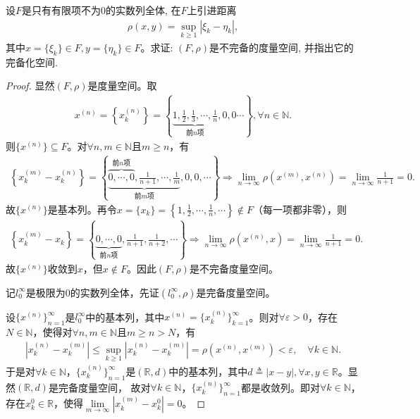 \documentclass[../../main.tex]{subfiles}%
\begin{document}
\begin{example}
设$F$是只有有限项不为$0$的实数列全体, 在$F$上引进距离
\begin{align*}
\rho(x,y)=\sup\limits_{k\geqslant1}|\xi_k-\eta_k|,
\end{align*}
其中$x=\{\xi_k\}\in F, y=\{\eta_k\}\in F$。求证: $(F,\rho)$是不完备的度量空间, 并指出它的完备化空间.
\end{example}
\begin{proof}

显然$(F,\rho)$是度量空间。取
\begin{align*}
x^{(n)}=\left\{x_k^{(n)}\right\}=\left\{\underbrace{1,\frac{1}{2},\frac{1}{3},\cdots,\frac{1}{n}}_{\text{前}n\text{项}},0,0\cdots\right\},\forall n\in\mathbb{N}.
\end{align*}
则$\{x^{(n)}\}\subseteq F$。对$\forall n,m\in\mathbb{N}$且$m\geqslant n$，有
\begin{align*}
\left\{x_k^{(m)}-x_k^{(n)}\right\}=\left\{\underbrace{\overbrace{0,\cdots,0}^{\text{前}n\text{项}},\frac{1}{n+1},\cdots,\frac{1}{m}}_{\text{前}m\text{项}},0,0,\cdots\right\}\Longrightarrow\lim\limits_{n\rightarrow\infty}\rho(x^{(m)},x^{(n)})=\lim\limits_{n\rightarrow\infty}\frac{1}{n+1}=0.
\end{align*}
故$\{x^{(n)}\}$是基本列。再令$x=\{x_k\}=\left\{1,\frac{1}{2},\cdots,\frac{1}{n},\cdots\right\}\notin F$（每一项都非零），则
\begin{align*}
\left\{x_k^{(m)}-x_k\right\}=\left\{\underbrace{0,\cdots,0}_{\text{前}n\text{项}},\frac{1}{n+1},\frac{1}{n+2},\cdots\right\}\Longrightarrow\lim\limits_{n\rightarrow\infty}\rho(x^{(n)},x)=\lim\limits_{n\rightarrow\infty}\frac{1}{n+1}=0.
\end{align*}
故$\{x^{(n)}\}$收敛到$x$，但$x\notin F$。因此$(F,\rho)$是不完备度量空间。

记$l_0^\infty$是极限为$0$的实数列全体，先证$(l_0^\infty,\rho)$是完备度量空间。

设$\{x^{(n)}\}_{n=1}^{\infty}$是$l_0^\infty$中的基本列，其中$x^{(n)}=\{x_k^{(n)}\}_{k=1}^{\infty}$。则对$\forall \varepsilon>0$，存在$N\in\mathbb{N}$，使得对$\forall n,m\in\mathbb{N}$且$m\geqslant n>N$，有
\begin{align*}
\left|x_k^{(n)}-x_k^{(m)}\right|\leqslant\sup\limits_{k\geqslant 1}\left|x_k^{(n)}-x_k^{(m)}\right|=\rho(x^{(n)},x^{(m)})<\varepsilon,\quad \forall k\in\mathbb{N}.
\end{align*}
于是对$\forall k\in\mathbb{N}$，$\{x_k^{(n)}\}_{n=1}^{\infty}$是$(\mathbb{R},d)$中的基本列，其中$d\triangleq|x-y|,\forall x,y\in\mathbb{R}$。显然$(\mathbb{R},d)$是完备度量空间，
故对$\forall k\in\mathbb{N}$，$\{x_k^{(n)}\}_{n=1}^{\infty}$都是收敛列。即对$\forall k\in\mathbb{N}$，存在$x_k^0\in\mathbb{R}$，使得$\lim\limits_{m\rightarrow\infty}\left|x_k^{(m)}-x_k^0\right|=0$。


\end{proof}
\end{document}
